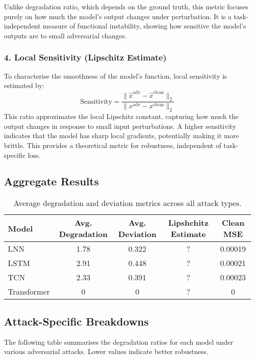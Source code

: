 Unlike degradation ratio, which depends on the ground truth, this metric focuses purely on how much the model's output changes under perturbation. It is a task-independent measure of functional instability, showing how sensitive the model's outputs are to small adversarial changes.

\subsubsection*{4. Local Sensitivity (Lipschitz Estimate)}
To characterise the smoothness of the model's function, local sensitivity is estimated by:
\[
\text{Sensitivity} = \frac{\| \hat{x}^{\text{adv}} - \hat{x}^{\text{clean}} \|_2}{\| x^{\text{adv}} - x^{\text{clean}} \|_2}
\]
This ratio approximates the local Lipschitz constant, capturing how much the output changes in response to small input perturbations. A higher sensitivity indicates that the model has sharp local gradients, potentially making it more brittle. This provides a theoretical metric for robustness, independent of task-specific loss.

\subsection{Aggregate Results}

\begin{table}[H]
\centering
\begin{tabular}{|l|c|c|c|c|}
\hline
\textbf{Model} & \textbf{Avg. Degradation} & \textbf{Avg. Deviation} & \textbf{Lipshchitz Estimate} & \textbf{Clean MSE} \\
\hline
LNN         & 1.78 & 0.322 & ? & 0.00019 \\
LSTM        & 2.91 & 0.448 & ? & 0.00021 \\
TCN         & 2.33 & 0.391 & ? & 0.00023 \\
Transformer & 0 & 0 & ? & 0 \\ 
\hline
\end{tabular}
\caption{Average degradation and deviation metrics across all attack types.}
\label{tab:agg_metrics}
\end{table}

\subsection{Attack-Specific Breakdowns}

The following table summarises the degradation ratios for each model under various adversarial attacks. Lower values indicate better robustness.

